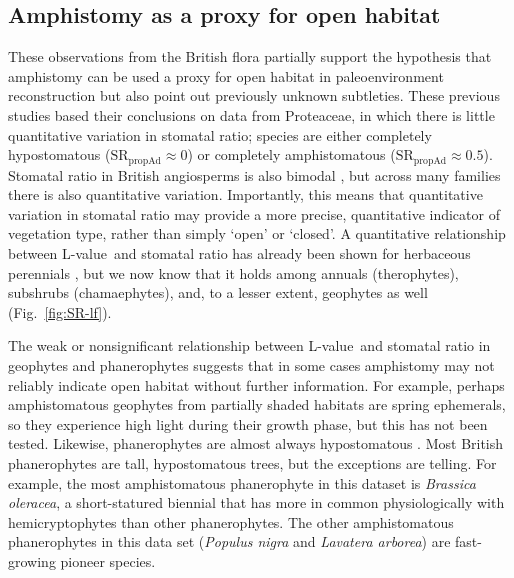\documentclass[12pt, oneside]{article}
\newcommand{\el}{L-value}
\begin{document}
\subsection*{Amphistomy as a proxy for open habitat}

These observations from the British flora partially support the hypothesis that amphistomy can be used a proxy for open habitat in paleoenvironment reconstruction \citep{Carpenter_1994, Jordan_etal_2014, Carpenter_etal_2015} but also point out previously unknown subtleties. These previous studies based their conclusions on data from Proteaceae, in which there is little quantitative variation in stomatal ratio; species are either completely hypostomatous ($\mathrm{SR_{propAd}} \approx 0$) or completely amphistomatous ($\mathrm{SR_{propAd}} \approx 0.5$). Stomatal ratio in British angiosperms is also bimodal \citep{Peat_Fitter_1994b}, but across many families there is also quantitative variation. Importantly, this means that quantitative variation in stomatal ratio may provide a more precise, quantitative indicator of vegetation type, rather than simply `open' or `closed'. A quantitative relationship between \el~and stomatal ratio has already been shown for herbaceous perennials \citep{Bucher_etal_2017}, but we now know that it holds among annuals (therophytes), subshrubs (chamaephytes), and, to a lesser extent, geophytes as well (Fig.~\ref{fig:SR-lf}). 

The weak or nonsignificant relationship between \el~and stomatal ratio in geophytes and phanerophytes suggests that in some cases amphistomy may not reliably indicate open habitat without further information. For example, perhaps amphistomatous geophytes from partially shaded habitats are spring ephemerals, so they  experience high light during their growth phase, but this has not been tested. Likewise, phanerophytes are almost always hypostomatous \citep[see also][]{Muir_2015}. Most British phanerophytes are tall, hypostomatous trees, but the exceptions are telling. For example, the most amphistomatous phanerophyte in this dataset is \textit{Brassica oleracea}, a short-statured biennial that has more in common physiologically with hemicryptophytes than other phanerophytes. The other amphistomatous phanerophytes in this data set (\textit{Populus nigra} and \textit{Lavatera arborea}) are fast-growing pioneer species.
\end{document}
